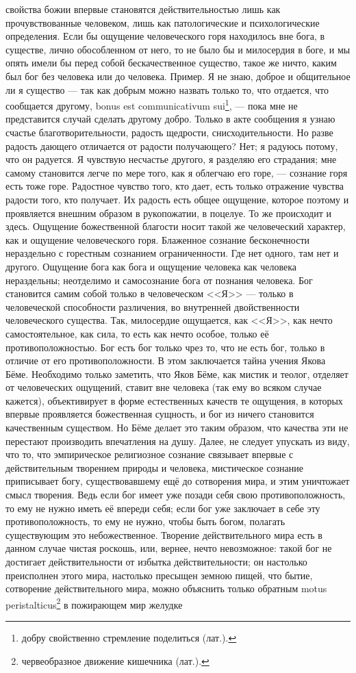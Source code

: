 \documentclass[12pt,oneside]{book}
\begin{document}
свойства божии впервые становятся действительностью лишь как прочувствованные человеком, лишь как патологические и психологические определения. Если бы ощущение человеческого горя находилось вне бога, в существе, лично обособленном от него, то не было бы и милосердия в боге, и мы опять имели бы перед собой бескачественное существо, такое же ничто, каким был бог без человека или до человека. Пример. Я не знаю, доброе и общительное ли я существо --- так как добрым можно назвать только то, что отдается, что сообщается другому, bonus est communicativum sui\footnote{добру свойственно стремление поделиться (лат.).}, --- пока мне не представится случай сделать другому добро. Только в акте сообщения я узнаю счастье благотворительности, радость щедрости, снисходительности. Но разве радость дающего отличается от радости получающего? Нет; я радуюсь потому, что он радуется. Я чувствую несчастье другого, я разделяю его страдания; мне самому становится легче по мере того, как я облегчаю его горе, --- сознание горя есть тоже горе. Радостное чувство того, кто дает, есть только отражение чувства радости того, кто получает. Их радость есть общее ощущение, которое поэтому и проявляется внешним образом в рукопожатии, в поцелуе. То же происходит и здесь. Ощущение божественной благости носит такой же человеческий характер, как и ощущение человеческого горя. Блаженное сознание бесконечности нераздельно с горестным сознанием ограниченности. Где нет одного, там нет и другого. Ощущение бога как бога и ощущение человека как человека нераздельны; неотделимо и самосознание бога от познания человека. Бог становится самим собой только в человеческом <<Я>> --- только в человеческой способности различения, во внутренней двойственности человеческого существа. Так, милосердие ощущается, как <<Я>>, как нечто самостоятельное, как сила, то есть как нечто особое, только её противоположностью. Бог есть бог только чрез то, что не есть бог, только в отличие от его противоположности. В этом заключается тайна учения Якова Бёме. Необходимо только заметить, что Яков Бёме, как мистик и теолог, отделяет от человеческих ощущений, ставит вне человека (так ему во всяком случае кажется), объективирует в форме естественных качеств те ощущения, в которых впервые проявляется божественная сущность, и бог из ничего становится качественным существом. Но Бёме делает это таким образом, что качества эти не перестают производить впечатления на душу. Далее, не следует упускать из виду, что то, что эмпирическое религиозное сознание связывает впервые с действительным творением природы и человека, мистическое сознание приписывает богу, существовавшему ещё до сотворения мира, и этим уничтожает смысл творения. Ведь если бог имеет уже позади себя свою противоположность, то ему не нужно иметь её впереди себя; если бог уже заключает в себе эту противоположность, то ему не нужно, чтобы быть богом, полагать существующим это небожественное. Творение действительного мира есть в данном случае чистая роскошь, или, вернее, нечто невозможное: такой бог не достигает действительности от избытка действительности; он настолько преисполнен этого мира, настолько пресыщен земною пищей, что бытие, сотворение действительного мира, можно объяснить только обратным motus peristalticus\footnote{червеобразное движение кишечника (лат.).} в пожирающем мир желудке 
\end{document}
